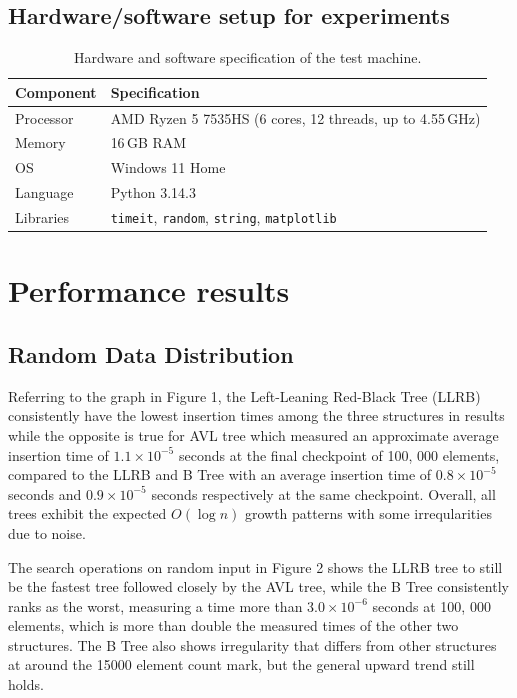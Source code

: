 \documentclass[12pt]{article}
\begin{document}
\subsection{Hardware/software setup for experiments}
\begin{table}[H]
    \centering
    \label{tab:hw_sw}
    \begin{tabular}{|l|l|}
        \hline
        \textbf{Component} & \textbf{Specification} \\
        \hline
        Processor & AMD Ryzen 5 7535HS (6 cores, 12 threads, up to 4.55\,GHz) \\
        Memory    & 16\,GB RAM \\
        OS        & Windows 11 Home \\
        Language  & Python 3.14.3 \\
        Libraries & \texttt{timeit}, \texttt{random}, \texttt{string}, \texttt{matplotlib} \\
        \hline
    \end{tabular}
    \caption{Hardware and software specification of the test machine.}
\end{table}



\section{Performance results}


\subsection{Random Data Distribution}
Referring to the graph in Figure 1, the Left-Leaning Red-Black Tree (LLRB) consistently have the lowest insertion times among the three structures in results while the opposite is true for AVL tree which measured an approximate average insertion time of $1.1 \times 10^{-5}$ seconds at the final checkpoint of 100, 000 elements, compared to the LLRB and B Tree with an average insertion time of $0.8 \times 10^{-5}$ seconds and $0.9 \times 10^{-5}$ seconds respectively at the same checkpoint. Overall, all trees exhibit the expected $O (\log n)$ growth patterns with some irreqularities due to noise.

The search operations on random input in Figure 2 shows the LLRB tree to still be the fastest tree followed closely by the AVL tree, while the B Tree consistently ranks as the worst, measuring a time more than $3.0 \times 10^{-6}$ seconds at 100, 000 elements, which is more than double the measured times of the other two structures. The B Tree also shows irregularity that differs from other structures at around the 15000 element count mark, but the general upward trend still holds.
\end{document}
